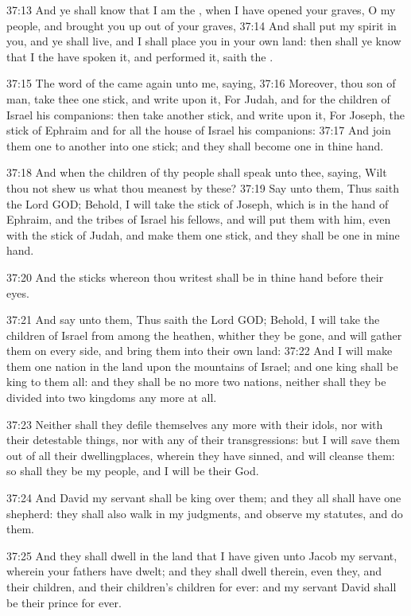 37:13 And ye shall know that I am the \LORD, when I have opened your
graves, O my people, and brought you up out of your graves, 37:14 And
shall put my spirit in you, and ye shall live, and I shall place you
in your own land: then shall ye know that I the \LORD have spoken it,
and performed it, saith the \LORD.

37:15 The word of the \LORD came again unto me, saying, 37:16 Moreover,
thou son of man, take thee one stick, and write upon it, For Judah,
and for the children of Israel his companions: then take another
stick, and write upon it, For Joseph, the stick of Ephraim and for all
the house of Israel his companions: 37:17 And join them one to another
into one stick; and they shall become one in thine hand.

37:18 And when the children of thy people shall speak unto thee,
saying, Wilt thou not shew us what thou meanest by these?  37:19 Say
unto them, Thus saith the Lord GOD; Behold, I will take the stick of
Joseph, which is in the hand of Ephraim, and the tribes of Israel his
fellows, and will put them with him, even with the stick of Judah, and
make them one stick, and they shall be one in mine hand.

37:20 And the sticks whereon thou writest shall be in thine hand
before their eyes.

37:21 And say unto them, Thus saith the Lord GOD; Behold, I will take
the children of Israel from among the heathen, whither they be gone,
and will gather them on every side, and bring them into their own
land: 37:22 And I will make them one nation in the land upon the
mountains of Israel; and one king shall be king to them all: and they
shall be no more two nations, neither shall they be divided into two
kingdoms any more at all.

37:23 Neither shall they defile themselves any more with their idols,
nor with their detestable things, nor with any of their
transgressions: but I will save them out of all their dwellingplaces,
wherein they have sinned, and will cleanse them: so shall they be my
people, and I will be their God.

37:24 And David my servant shall be king over them; and they all shall
have one shepherd: they shall also walk in my judgments, and observe
my statutes, and do them.

37:25 And they shall dwell in the land that I have given unto Jacob my
servant, wherein your fathers have dwelt; and they shall dwell
therein, even they, and their children, and their children's children
for ever: and my servant David shall be their prince for ever.

